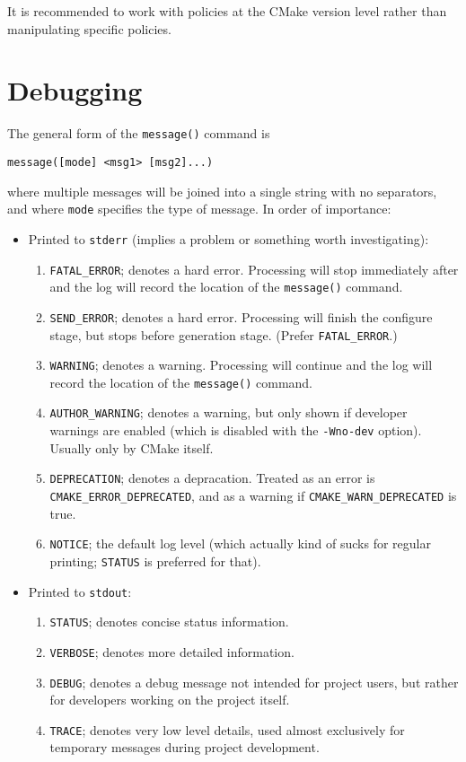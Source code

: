 \documentclass[8pt, table, xcdraw]{article}%
\begin{document}
It is recommended to work with policies at the CMake version level rather than manipulating specific policies.

\section{Debugging}

The general form of the \lstinline{message()} command is

\begin{lstlisting}
message([mode] <msg1> [msg2]...)
\end{lstlisting}

where multiple messages will be joined into a single string with no separators, and where \lstinline{mode} specifies the type of message. In order of importance:

\begin{itemize}
    \item Printed to \lstinline{stderr} (implies a problem or something worth investigating):
    \begin{enumerate}
        \item \lstinline{FATAL_ERROR}; denotes a hard error. Processing will stop immediately after and the log will record the location of the \lstinline{message()} command.
        \item \lstinline{SEND_ERROR}; denotes a hard error. Processing will finish the configure stage, but stops before generation stage. (Prefer \lstinline{FATAL_ERROR}.)
        \item \lstinline{WARNING}; denotes a warning. Processing will continue and the log will record the location of the \lstinline{message()} command.
        \item \lstinline{AUTHOR_WARNING}; denotes a warning, but only shown if developer warnings are enabled (which is disabled with the \lstinline{-Wno-dev} option). Usually only by CMake itself.
        \item \lstinline{DEPRECATION}; denotes a depracation. Treated as an error is \lstinline{CMAKE_ERROR_DEPRECATED}, and as a warning if \lstinline{CMAKE_WARN_DEPRECATED} is true.
        \item \lstinline{NOTICE}; the default log level (which actually kind of sucks for regular printing; \lstinline{STATUS} is preferred for that).
    \end{enumerate}
    \item Printed to \lstinline{stdout}:
    \begin{enumerate}[start=7]
        \item \lstinline{STATUS}; denotes concise status information.
        \item \lstinline{VERBOSE}; denotes more detailed information.
        \item \lstinline{DEBUG}; denotes a debug message not intended for project users, but rather for developers working on the project itself.
        \item \lstinline{TRACE}; denotes very low level details, used almost exclusively for temporary messages during project development.
    \end{enumerate}
\end{itemize}
\end{document}
